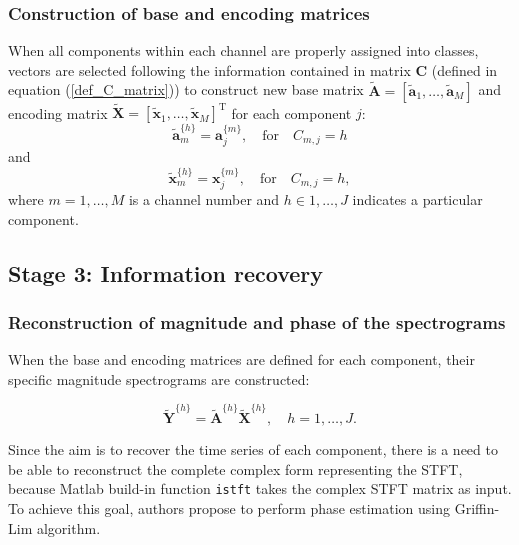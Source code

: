 \documentclass[3p,12pt]{elsarticle}
\begin{document}
\subsubsection{Construction of base and encoding matrices}\label{rec}

When all components within each channel are properly assigned into classes, vectors are selected following the information contained in matrix $\mathbf{C}$ (defined in equation (\ref{def_C_matrix})) to construct new base matrix $\widetilde{\mathbf{A}}=[\widetilde{\mathbf{a}}_1,\dots,\widetilde{\mathbf{a}}_M]$ and encoding matrix $\widetilde{\mathbf{X}}=[\widetilde{\mathbf{x}}_1,\dots,\widetilde{\mathbf{x}}_M]^\textrm{T}$ for each component $j$:
\begin{equation}
    \widetilde{\mathbf{a}}^{\{h\}}_m= \mathbf{a}^{\{m\}}_j, \quad \textrm{for} \quad  C_{m,j}=h
\end{equation}
and
\begin{equation}
    \widetilde{\mathbf{x}}^{\{h\}}_m= \mathbf{x}^{\{m\}}_j, \quad \textrm{for} \quad C_{m,j}=h,
\end{equation}
where $m=1,\dots,M$ is a channel number and $h\in 1,\dots,J$ indicates a particular component.

\subsection{Stage 3: Information recovery}
\subsubsection{Reconstruction of magnitude and phase of the spectrograms}\label{gla}

When the base and encoding matrices are defined for each component, their specific magnitude spectrograms are constructed:

\begin{equation}
    \widetilde{\mathbf{Y}}^{\{h\}}=\widetilde{\mathbf{A}}^{\{h\}}\widetilde{\mathbf{X}}^{\{h\}}, \quad h=1,\dots,J.
\end{equation}

Since the aim is to recover the time series of each component, there is a need to be able to reconstruct the complete complex form representing the STFT, because Matlab build-in function \texttt{istft} takes the complex STFT matrix as input. To achieve this goal, authors propose to perform phase estimation using Griffin-Lim algorithm.
\end{document}
